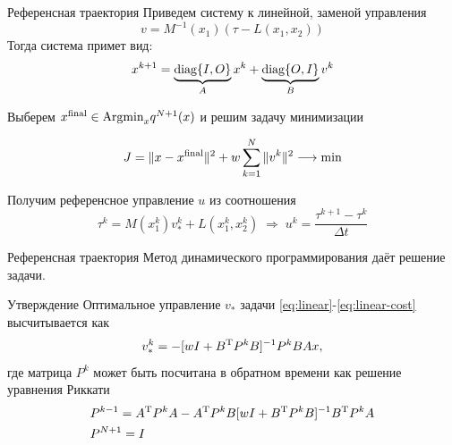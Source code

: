     \begin{frame}{Референсная траектория}
        Приведем систему к линейной, заменой управления
        $$
            v = M^{-1}(x_1)(\tau - L(x_1, x_2))
        $$
        Тогда система примет вид:
        \begin{equation}\label{eq:linear}
            x^{k+1} =  \underbrace{\textnormal{diag}\{I,O\}}_{A} x^{k} + \underbrace{\textnormal{diag}\{O, I\}}_{B} v^{k}
        \end{equation}

        Выберем $x^{\textnormal{final}} \in \textnormal{Argmin}_{x} q^{N+1}(x)$ и решим задачу минимизации

        \begin{equation}\label{eq:linear-cost}
            J = \| x-x^{\textnormal{final}} \|^2 + w \sum_{k=1}^{N} \| v^k \|^2 \longrightarrow \textnormal{min}
        \end{equation}

        Получим референсное управление $u$ из соотношения
        $$
            \tau^k = M(x_1^k)v^k_* + L(x_1^k,x_2^k) \;\Longrightarrow\; u^{k} = \frac{\tau^{k+1} - \tau^{k}}{\Delta t}
        $$
    \end{frame}

    \begin{frame}{Референсная траектория}
        Метод динамического программирования даёт решение задачи.
        \vfill
        \begin{block}{Утверждение}
            Оптимальное управление $v_*$ задачи \eqref{eq:linear}-\eqref{eq:linear-cost} высчитывается как
            $$
                v^k_* = -[wI + B^{\textnormal{T}}P^kB]^{-1} P^k B A x,
            $$
            где матрица $P^k$ может быть посчитана в обратном времени как решение уравнения Риккати
            $$
                \begin{aligned}
                    &P^{k-1} = A^{\textnormal{T}} P^{k} A - A^{\textnormal{T}} P^k B [wI + B^{\textnormal{T}} P^k B]^{-1} B^{\textnormal{T}} P^{k} A
                    \\
                    &P^{N+1} = I
                \end{aligned}
            $$
        \end{block}
    \end{frame}

